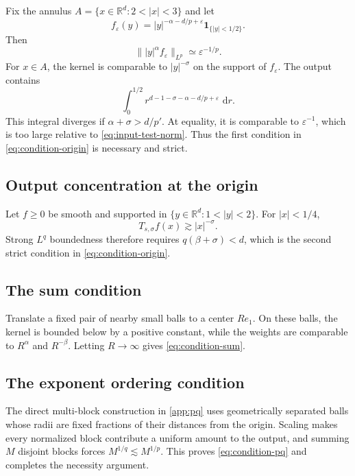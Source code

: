 \documentclass[11pt]{amsart}
\numberwithin{equation}{section}
\theoremstyle{plain}
\theoremstyle{definition}
\theoremstyle{remark}
\newcommand{\RR}{\mathbb{R}}
\newcommand{\dd}{\,\mathrm{d}}
\newcommand{\one}{\mathbf{1}}
\begin{document}
Fix the annulus $A=\{x\in\RR^d:2<|x|<3\}$ and let
\begin{equation}
 f_\varepsilon(y)
 =|y|^{-\alpha-d/p+\varepsilon}\one_{\{|y|<1/2\}}.
 \label{eq:input-test}
\end{equation}
Then
\begin{equation}
 \bigl\||y|^\alpha f_\varepsilon\bigr\|_{L^p}
 \simeq\varepsilon^{-1/p}.
 \label{eq:input-test-norm}
\end{equation}
For $x\in A$, the kernel is comparable to $|y|^{-\sigma}$ on the support of $f_\varepsilon$. The output contains
\begin{equation}
 \int_0^{1/2}
 r^{d-1-\sigma-\alpha-d/p+\varepsilon}\,\dd r.
 \label{eq:input-origin-integral}
\end{equation}
This integral diverges if $\alpha+\sigma>d/p'$. At equality, it is comparable to $\varepsilon^{-1}$, which is too large relative to \cref{eq:input-test-norm}. Thus the first condition in \cref{eq:condition-origin} is necessary and strict.

\subsection{Output concentration at the origin}

Let $f\ge0$ be smooth and supported in $\{y\in\RR^d:1<|y|<2\}$. For $|x|<1/4$,
\begin{equation}
 T_{s,\sigma}f(x)\gtrsim |x|^{-\sigma}.
 \label{eq:output-origin-lower}
\end{equation}
Strong $L^q$ boundedness therefore requires $q(\beta+\sigma)<d$, which is the second strict condition in \cref{eq:condition-origin}.

\subsection{The sum condition}

Translate a fixed pair of nearby small balls to a center $Re_1$. On these balls, the kernel is bounded below by a positive constant, while the weights are comparable to $R^\alpha$ and $R^{-\beta}$. Letting $R\to\infty$ gives \cref{eq:condition-sum}.

\subsection{The exponent ordering condition}

The direct multi-block construction in \cref{app:pq} uses geometrically separated balls whose radii are fixed fractions of their distances from the origin. Scaling makes every normalized block contribute a uniform amount to the output, and summing $M$ disjoint blocks forces $M^{1/q}\lesssim M^{1/p}$. This proves \cref{eq:condition-pq} and completes the necessity argument.
\end{document}

